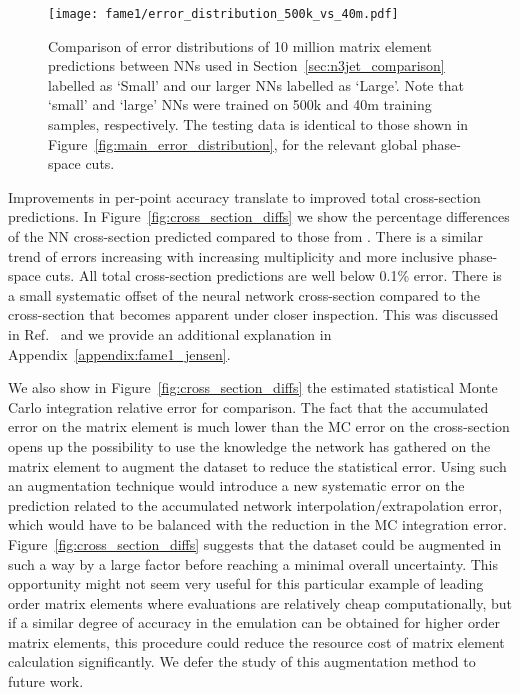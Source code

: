 \documentclass[main.tex]{subfiles}
\begin{document}
\begin{figure}
    \centering
    \texttt{[image: fame1/error\_distribution\_500k\_vs\_40m.pdf]}
    \caption{Comparison of error distributions of 10 million matrix element predictions between NNs used in Section~\ref{sec:n3jet_comparison} labelled as `Small' and our larger NNs labelled as `Large'.
    Note that `small' and `large' NNs were trained on 500k and 40m training samples, respectively.
    The testing data is identical to those shown in Figure~\ref{fig:main_error_distribution}, for the relevant global phase-space cuts.}
    \label{fig:error_500k_vs_40m}
\end{figure}


Improvements in per-point accuracy translate to improved total cross-section predictions.
In Figure~\ref{fig:cross_section_diffs} we show the percentage differences of the NN cross-section predicted compared to those from {\NJet}.
There is a similar trend of errors increasing with increasing multiplicity and more inclusive phase-space cuts.
All total cross-section predictions are well below 0.1\% error.
There is a small systematic offset of the neural network cross-section compared to the {\NJet} cross-section that becomes apparent under closer inspection.
This was discussed in Ref.~\cite{Badger:2020uow} and we provide an additional explanation in Appendix~\ref{appendix:fame1_jensen}.

We also show in Figure~\ref{fig:cross_section_diffs} the estimated statistical Monte Carlo integration relative error for comparison.
The fact that the accumulated error on the matrix element is much lower than the MC error on the cross-section opens up the possibility 
to use the knowledge the network has gathered on the matrix element to augment the dataset to reduce the statistical error. Using such an 
augmentation technique would introduce a new systematic error on the prediction related to the accumulated network interpolation/extrapolation error, 
which would have to be balanced with the reduction in the MC integration error. Figure~\ref{fig:cross_section_diffs} suggests that the dataset could be 
augmented in such a way by a large factor before reaching a minimal overall uncertainty. This opportunity might not seem very useful for this particular example of leading 
order matrix elements where evaluations are relatively cheap computationally, but 
if a similar degree of accuracy in the emulation can be obtained for higher order matrix elements, this procedure could reduce the resource cost of matrix element calculation
significantly. We defer the study of this augmentation method to future work.
\end{document}
